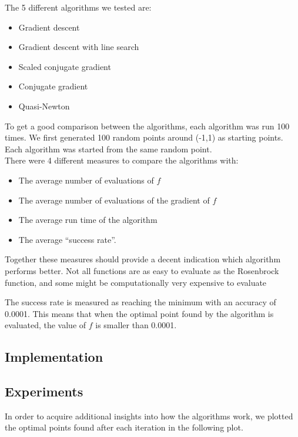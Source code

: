 \documentclass{article}
\begin{document}
The 5 different algorithms we tested are:
\begin{itemize}
\item Gradient descent
\item Gradient descent with line search
\item Scaled conjugate gradient
\item Conjugate gradient
\item Quasi-Newton
\end{itemize}

To get a good comparison between the algorithms, each algorithm was run 100 times.
We first generated 100 random points around (-1,1) as starting points. Each algorithm was started from the same random point.\\

There were 4 different measures to compare the algorithms with:
\begin{itemize}
\item The average number of evaluations of $f$
\item The average number of evaluations of the gradient of $f$
\item The average run time of the algorithm
\item The average ``success rate''. 
\end{itemize}

Together these measures should provide a decent indication which algorithm performs better. Not all functions are as easy to evaluate as the Rosenbrock function, and some might be computationally very expensive to evaluate

The success rate is measured as reaching the minimum with an accuracy of 0.0001. This means that when the optimal point found by the algorithm is evaluated, the value of $f$ is smaller than 0.0001.

\subsection{Implementation}

\subsection{Experiments}


In order to acquire additional insights into how the algorithms work, we plotted the optimal points found after each iteration in the following plot.
\end{document}
